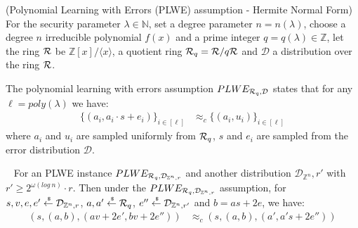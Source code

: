 \begin{definition}{(Polynomial Learning with Errors (PLWE) assumption - Hermite Normal Form)}
  For the security parameter $\lambda \in \mathbb{N}$, set a degree parameter $n = n(\lambda)$, choose a degree $n$ irreducible polynomial $f(x)$ and a prime integer $q = q(\lambda) \in \mathbb{Z}$, let the ring ${\mathcal{R}}$ be $\mathbb{Z}[x]/\langle x \rangle$, a quotient ring  ${\mathcal{R}}_q = {\mathcal{R}}/ q{\mathcal{R}}$ and $\mathcal{D}$ a distribution over the ring ${\mathcal{R}}$.

  The polynomial learning with errors assumption $PLWE_{{\mathcal{R}}_q, \mathcal{D}}$ states that for any $\ell = poly(\lambda)$ we have:
  \begin{align*}
    \{(a_i, a_i \cdot s + e_i)\}_{i \in [\ell]} &\approx_c \{(a_i, u_i)\}_{i \in [\ell]}
  \end{align*}
  where $a_i$ and $u_i$ are sampled uniformly from ${\mathcal{R}}_q$, $s$ and $e_i$ are sampled from the error distribution $\mathcal{D}$.

\end{definition}

\begin{lemma}~\cite{DBLP:conf/crypto/BrakerskiV11}
  For an PLWE instance $PLWE_{{\mathcal{R}}_q, \mathcal{D}_{\mathbb{Z}^n, r}}$ and another distribution $\mathcal{D}_{\mathbb{Z}^n},r'$ with $r' \geq 2^{\omega(log~n)} \cdot r$.
  Then under the $PLWE_{{\mathcal{R}}_q, \mathcal{D}_{\mathbb{Z}^n, r}}$ assumption, for $s, v, e, e' \stackrel{{\scriptscriptstyle \mkern4mu \$}}{\gets} \mathcal{D}_{\mathbb{Z}^n,r}$, $a, a' \stackrel{{\scriptscriptstyle \mkern4mu \$}}{\gets} {\mathcal{R}}_q$, $e'' \stackrel{{\scriptscriptstyle \mkern4mu \$}}{\gets} \mathcal{D}_{\mathbb{Z}^n, r'}$ and $b = as + 2e$,
  we have:
  \begin{align*}
    (s, (a, b), (av + 2e', bv + 2e'')) &\approx_c (s, (a,b), (a', a's+2e''))
  \end{align*}
\end{lemma}
